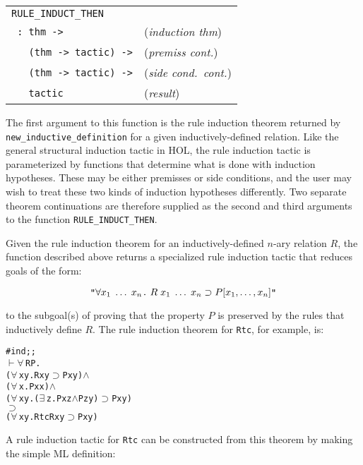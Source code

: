 \medskip

\noindent\begin{tabular}{@{\hskip\mathindent}l@{\hskip12.7mm}l@{}}
\verb!RULE_INDUCT_THEN! & \mbox{} \\
\verb! : thm ->! & ({\it induction thm\/})\\
\verb!   (thm -> tactic) ->! & ({\it premiss cont.\/})\\
\verb!   (thm -> tactic) ->! & ({\it side cond.\ cont.\/})\\
\verb!   tactic! & ({\it result\/})
\end{tabular}

\medskip

\noindent The first argument to this function is the rule \mbox{induction}
theorem returned by \verb!new_inductive_definition! for a given
inductively-defined relation.  Like the general structural induction tactic in
{\small HOL}, the rule induction tactic is parameterized by functions that
determine what is done with induction hypotheses. These may be either premisses
or side conditions, and the user may wish to treat these two kinds of induction
hypotheses differently. Two separate theorem continuations are therefore
supplied as the second and third arguments to the function
\verb!RULE_INDUCT_THEN!.

Given the rule induction theorem for an inductively-defined $n$-ary relation
$R$, the function described above returns a specialized rule induction tactic
that reduces goals of the form:

\[ \hbox{\verb!"!}\forall x_1\;\dots\;x_n\hbox{\verb!.!}\;
  R \;x_1\;\dots\;x_n \supset P[x_1,\dots,x_n]\hbox{\verb!"!} \]

\noindent to the subgoal(s) of proving that the property $P$ is preserved by
the rules that inductively define $R$.  The rule induction theorem for
\verb!Rtc!, for example, is:

\begin{session}\begin{alltt}
#ind;;
\(\vdash\) \(\forall\,\)R P.
   (\(\forall\,\)x y. R x y \(\supset\) P x y) \(\wedge\)
   (\(\forall\,\)x. P x x) \(\wedge\)
   (\(\forall\,\)x y. (\(\exists\,\)z. P x z \(\wedge\) P z y) \(\supset\) P x y) 
      \(\supset\)
   (\(\forall\,\)x y. Rtc R x y \(\supset\) P x y)
\end{alltt}\end{session}

\noindent A rule induction tactic for \verb!Rtc! can be constructed from this
theorem by making the simple {\small ML} definition:

